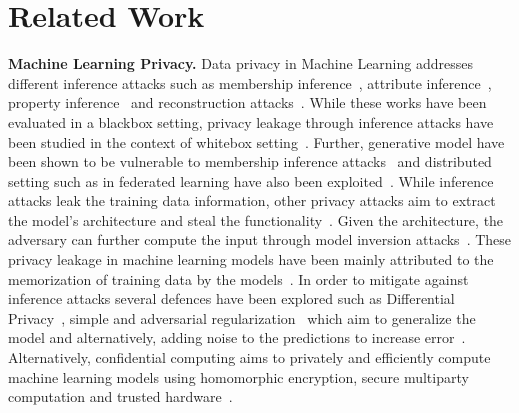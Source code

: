 \section{Related Work}\label{related}


\noindent\textbf{Machine Learning Privacy.} Data privacy in Machine Learning addresses different inference attacks such as membership inference~\cite{salem2018ml,shokri2017membership,10.1145/2976749.2978355,8429311}, attribute inference~\cite{Ateniese:2015:HSM:2829869.2829870}, property inference~\cite{Ganju:2018:PIA:3243734.3243834} and reconstruction attacks~\cite{1190751}.
While these works have been evaluated in a blackbox setting, privacy leakage through inference attacks have been studied in the context of whitebox setting~\cite{DBLP:journals/corr/abs-1812-00910}.
Further, generative model have been shown to be vulnerable to membership inference attacks~\cite{LOGANMembershipInferenceAttacksAgainstGenerativeModels} and distributed setting such as in federated learning have also been exploited~\cite{melis2019exploiting,DBLP:journals/corr/abs-1812-00910}.
While inference attacks leak the training data information, other privacy attacks aim to extract the model's architecture and steal the functionality~\cite{10.5555/3241094.3241142}.
Given the architecture, the adversary can further compute the input through model inversion attacks~\cite{Fredrikson:2015:MIA:2810103.2813677}.
These privacy leakage in machine learning models have been mainly attributed to the memorization of training data by the models~\cite{236216,10.1145/3133956.3134077,Song2020Overlearning}.
In order to mitigate against inference attacks several defences have been explored such as Differential Privacy~\cite{Abadi:2016:DLD:2976749.2978318}, simple and adversarial regularization~\cite{DBLP:conf/ccs/NasrSH18,salem2018ml} which aim to generalize the model and alternatively, adding noise to the predictions to increase error~\cite{217523,10.1145/3319535.3363201}.
Alternatively, confidential computing aims to privately and efficiently compute machine learning models using homomorphic encryption, secure multiparty computation and trusted hardware~\cite{235489,Bourse2017FastHE,217515}.


